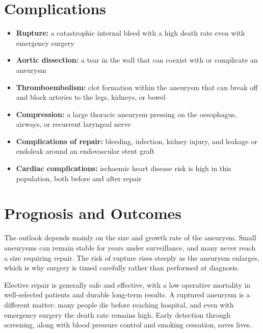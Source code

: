 \section*{Complications}
\begin{itemize}
    \item \textbf{Rupture:} a catastrophic internal bleed with a high death rate even with emergency surgery
    \item \textbf{Aortic dissection:} a tear in the wall that can coexist with or complicate an aneurysm
    \item \textbf{Thromboembolism:} clot formation within the aneurysm that can break off and block arteries to the legs, kidneys, or bowel
    \item \textbf{Compression:} a large thoracic aneurysm pressing on the oesophagus, airways, or recurrent laryngeal nerve
    \item \textbf{Complications of repair:} bleeding, infection, kidney injury, and leakage or endoleak around an endovascular stent graft
    \item \textbf{Cardiac complications:} ischaemic heart disease risk is high in this population, both before and after repair
\end{itemize}

\section*{Prognosis and Outcomes}
The outlook depends mainly on the size and growth rate of the aneurysm. Small aneurysms can remain stable for years under surveillance, and many never reach a size requiring repair. The risk of rupture rises steeply as the aneurysm enlarges, which is why surgery is timed carefully rather than performed at diagnosis.

Elective repair is generally safe and effective, with a low operative mortality in well-selected patients and durable long-term results. A ruptured aneurysm is a different matter: many people die before reaching hospital, and even with emergency surgery the death rate remains high. Early detection through screening, along with blood pressure control and smoking cessation, saves lives.


